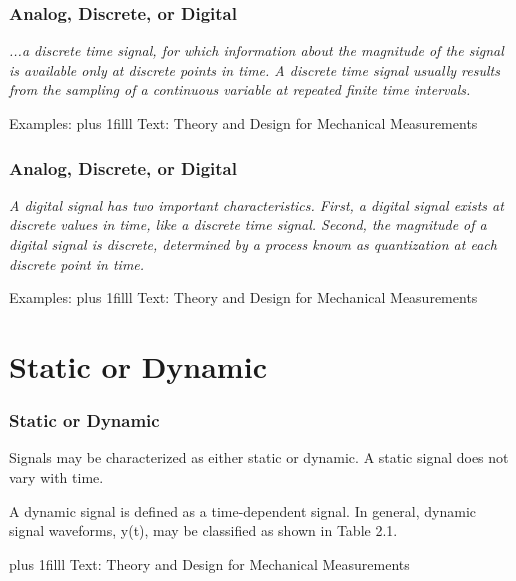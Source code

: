 \documentclass[fleqn]{beamer} %
\newcommand{\sectiontitleII}{Analog, Discrete, or Digital}
\newcommand{\sectiontitleIII}{Static or Dynamic}
\newcommand{\btVFill}{\vskip0pt plus 1filll}
\begin{document}
	\begin{frame} \small
		\frametitle{\sectiontitleII}    
		\bigskip  
			
		{\it ...a {\GR discrete time} signal, for which information about the
		magnitude of the signal is available only at discrete points in time. A discrete time signal usually
		results from the sampling of a continuous variable at repeated finite time intervals. }

		\vspace{30mm}
		Examples:
		\btVFill
		\tiny{Text: Theory and Design for Mechanical Measurements}	
	\end{frame}
	
	\begin{frame} \small
		\frametitle{\sectiontitleII}    
		\bigskip 
			{\it A {\BL digital} signal has two important characteristics. First, a digital signal
			exists at discrete values in time, like a discrete time signal. Second, the magnitude of a digital signal
			is discrete, determined by a process known as {\PR quantization} at each discrete point in time. }

		\vspace{30mm}
		Examples:
		\btVFill
		\tiny{Text: Theory and Design for Mechanical Measurements}	
	\end{frame}
	
\section{\sectiontitleIII}	
\begin{frame}[label=sectionIII] \small
\frametitle{\sectiontitleIII}
\bigskip

Signals may be characterized as either static or
dynamic. A static signal does not vary with time.

A dynamic signal is defined as a time-dependent signal. In general, dynamic signal waveforms,
y(t), may be classified as shown in Table 2.1.
	
\btVFill
\tiny{Text: Theory and Design for Mechanical Measurements}		
\end{frame}
\end{document}
